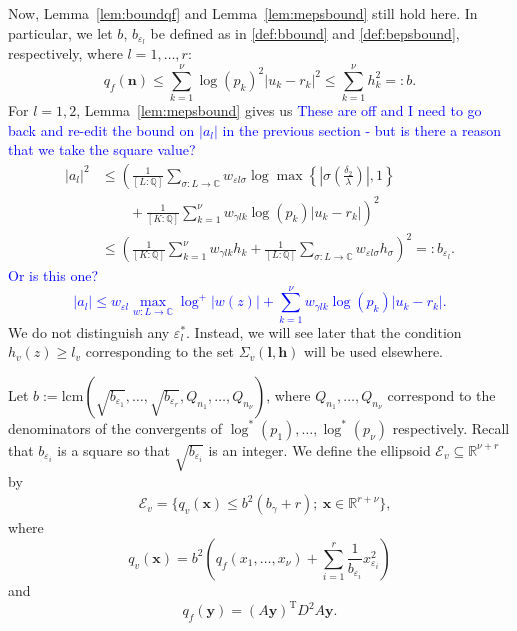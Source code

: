 \documentclass[11pt]{report}
\theoremstyle{definition}
\newcommand{\eps}{\varepsilon}
\newcommand{\edit}[1]{\textcolor{blue}{#1}}
\begin{document}
Now, Lemma~\ref{lem:boundqf} and Lemma~\ref{lem:mepsbound} still hold here. In particular, we let $b$, $b_{\eps_l}$ be defined as in \eqref{def:bbound} and \eqref{def:bepsbound}, respectively, where $l = 1, \dots, r$:
\begin{equation}
q_f(\mathbf{n}) \leq \sum_{k = 1}^{\nu} \log(p_k)^2|u_k -r_k|^2 \leq \sum_{k = 1}^{\nu} h_k^2=:b.
\end{equation}
For $l = 1, 2$, Lemma~\ref{lem:mepsbound} gives us
\edit{These are off and I need to go back and re-edit the bound on $|a_l|$ in the previous section - but is there a reason that we take the square value?}
\begin{align}
|a_l|^2 &\leq \left(\frac{1}{[L:\mathbb{Q}]}\sum_{\sigma :L \to \mathbb{C}} w_{\varepsilon l \sigma}\log \max \left\{ \left|\sigma\left(\frac{\delta_2}{\lambda}\right)\right|, 1\right\} \right.\\
	& \quad \quad+ \left. \frac{1}{[K:\mathbb{Q}]}\sum_{k = 1}^{\nu} w_{\gamma l k}\log(p_k)|u_k - r_k|\right)^2\\
	&\leq \left( \frac{1}{[K:\mathbb{Q}]}\sum_{k = 1}^{\nu} w_{\gamma l k}h_k + \frac{1}{[L:\mathbb{Q}]}\sum_{\sigma:L\to \mathbb{C}} w_{\varepsilon l \sigma}h_{\sigma}\right)^2 =: b_{\eps_l}.
\end{align}
\edit{ Or is this one?
\[|a_l| \leq w_{\eps l}\max_{w:L \to \mathbb{C}} \log^+|w(z)| + \sum_{k = 1}^{\nu} w_{\gamma l k}\log(p_k)|u_k - r_k|.\]}
We do not distinguish any $\varepsilon_l^*$. Instead, we will see later that the condition $h_{v}(z) \geq l_{v}$ corresponding to the set $\Sigma_v(\mathbf{l}, \mathbf{h})$ will be used elsewhere.

Let $b:= \text{lcm}\left(\sqrt{b_{\varepsilon_1}}, \dots, \sqrt{b_{\varepsilon_r}},Q_{n_1}, \dots, Q_{n_{\nu}}\right)$, where $Q_{n_1}, \dots, Q_{n_{\nu}}$ correspond to the denominators of the convergents of $\log^*(p_1), \dots, \log^*(p_{\nu})$ respectively. Recall that $b_{\varepsilon_i}$ is a square so that $\sqrt{b_{\varepsilon_i}}$ is an integer. We define the ellipsoid $\mathcal{E}_v \subseteq \mathbb{R}^{\nu + r}$ by
\begin{align}\label{def:ellp}
  & \mathcal{E}_v= \{q_v(\mathbf{x})\leq b^2(b_{\gamma}+r); \ \mathbf{x}\in\mathbb{R}^{r+\nu}\},
\end{align}
where
\[q_v(\mathbf{x})= b^2\left( q_f(x_1, \dots, x_{\nu}) +
    \sum_{i = 1}^r\frac{1}{b_{\varepsilon_i}}x_{\varepsilon_i}^2\right)\]
and
\[q_f(\mathbf{y}) = (A\mathbf{y})^{\text{T}}D^2A\mathbf{y}.\]
\end{document}
